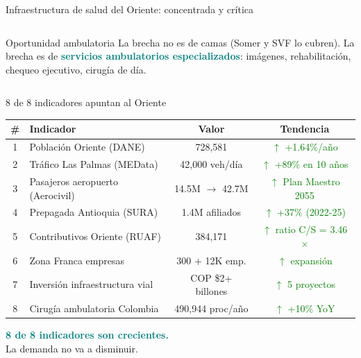 \documentclass[aspectratio=169, 11pt]{beamer}
\newcommand{\highlight}[1]{\textcolor{teal}{\textbf{#1}}}
\newcommand{\src}[1]{\par\vspace{2pt}{\tiny\textcolor{slate}{Fuente: #1}}}
\begin{document}
{\begin{frame}{Infraestructura de salud del Oriente: concentrada y crítica}
\begin{columns}[T]
\vspace{2pt}
\begin{exampleblock}{\small Oportunidad ambulatoria}
\scriptsize
La brecha no es de camas (Somer y SVF lo cubren). La brecha es de \highlight{servicios ambulatorios especializados}: imágenes, rehabilitación, chequeo ejecutivo, cirugía de día.
\end{exampleblock}
\end{columns}
\end{frame}
}

\begin{frame}{8 de 8 indicadores apuntan al Oriente}

\vspace{-2pt}
\begin{center}
{\scriptsize\setlength{\tabcolsep}{4pt}
\begin{tabular}{@{}clcc@{}}
\toprule
\textbf{\#} & \textbf{Indicador} & \textbf{Valor} & \textbf{Tendencia} \\
\midrule
1 & Población Oriente (DANE) & 728,581 & \textcolor{green}{$\uparrow$ +1.64\%/año} \\
\rowcolor{teal!6}
2 & Tráfico Las Palmas (MEData) & 42,000 veh/día & \textcolor{green}{$\uparrow$ +89\% en 10 años} \\
3 & Pasajeros aeropuerto (Aerocivil) & 14.5M $\to$ 42.7M & \textcolor{green}{$\uparrow$ Plan Maestro 2055} \\
\rowcolor{teal!6}
4 & Prepagada Antioquia (SURA) & 1.4M afiliados & \textcolor{green}{$\uparrow$ +37\% (2022-25)} \\
5 & Contributivos Oriente (RUAF) & 384,171 & \textcolor{green}{$\uparrow$ ratio C/S = 3.46$\times$} \\
\rowcolor{teal!6}
6 & Zona Franca empresas & 300 + 12K emp. & \textcolor{green}{$\uparrow$ expansión} \\
7 & Inversión infraestructura vial & COP \$2+ billones & \textcolor{green}{$\uparrow$ 5 proyectos} \\
\rowcolor{teal!6}
8 & Cirugía ambulatoria Colombia & 490,944 proc/año & \textcolor{green}{$\uparrow$ +10\% YoY} \\
\bottomrule
\end{tabular}
}
\end{center}

\vspace{6pt}
\begin{exampleblock}{}
\centering\large
\highlight{8 de 8 indicadores son crecientes.}\\[4pt]
\footnotesize La demanda no va a disminuir.
\end{exampleblock}

\src{DANE, MEData, Aerocivil, SURA, RUAF, MinSalud}
\end{frame}
\end{document}
